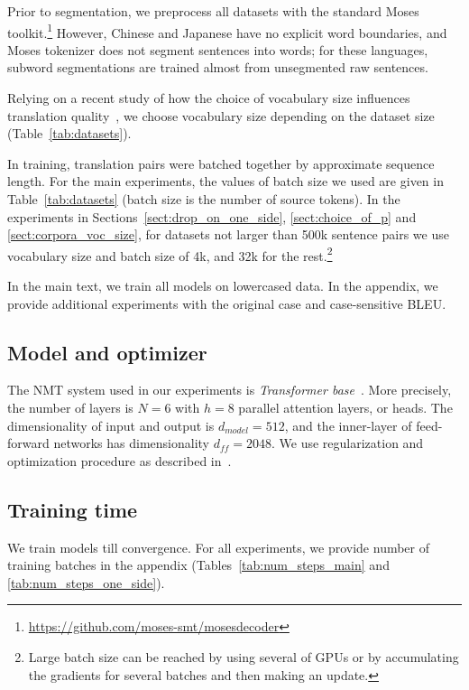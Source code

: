 \documentclass[11pt,a4paper]{article}
\begin{document}
Prior to segmentation, we preprocess all datasets with the standard Moses toolkit.\footnote{\url{https://github.com/moses-smt/mosesdecoder}}
However, Chinese and Japanese have no explicit word boundaries, and Moses tokenizer does not segment sentences into words; for these languages, subword segmentations are trained almost from unsegmented raw sentences.


Relying on a recent study of how the choice of vocabulary size influences translation quality~\cite{lowresBPE}, we choose vocabulary size depending on the dataset size (Table~\ref{tab:datasets}). 

In training, translation pairs  were  batched  together  by  approximate  sequence length. For the main experiments, the values of batch size we used are given in Table~\ref{tab:datasets} (batch size is the number of source tokens). In the experiments in Sections~\ref{sect:drop_on_one_side}, \ref{sect:choice_of_p} and \ref{sect:corpora_voc_size}, for datasets not larger than 500k sentence pairs we use vocabulary size and batch size of 4k, and 32k for the rest.\footnote{Large batch size can be reached by using several of GPUs or by accumulating the gradients for several batches and then making an update.}

In the main text, we train all models on lowercased data. In the appendix, we provide additional experiments with the original case and case-sensitive BLEU.




\subsection{Model and optimizer}
\label{sect:model_parameters}

The NMT system used in our experiments is {\it Transformer base}~\cite{transformer}.  More precisely, the number of layers is $N=6$ with $h = 8$ parallel attention layers, or heads. The dimensionality of input and output is $d_{model} = 512$, and the inner-layer of feed-forward networks has dimensionality $d_{ff}=2048$. We use regularization and optimization procedure as described in~\citet{transformer}. 


\subsection{Training time}

We train models till convergence. For all experiments, we provide number of training batches  in the appendix (Tables~\ref{tab:num_steps_main} and \ref{tab:num_steps_one_side}).
\end{document}
